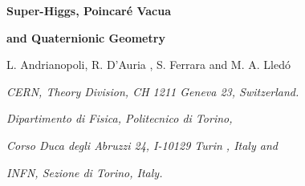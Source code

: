 \documentclass[a4paper,12pt]{article}
\begin{document}

\providecommand{\R}{\mathbb{R}}
\providecommand{\C}{\mathbb{C}}
\providecommand{\Z}{\mathbb{Z}}
\providecommand{\Hb}{\mathbb{H}}

\providecommand{\rE}{\mathrm{E}}
\providecommand{\ii}{\mathrm{i}}
\providecommand{\rSp}{\mathrm{Sp}}
\providecommand{\rSO}{\mathrm{SO}}
\providecommand{\rSL}{\mathrm{SL}}
\providecommand{\rSU}{\mathrm{SU}}
\providecommand{\rUSp}{\mathrm{USp}}
\providecommand{\rU}{\mathrm{U}}
\providecommand{\rF}{\mathrm{F}}
\providecommand{\rGL}{\mathrm{GL}}
\providecommand{\rG}{\mathrm{G}}
\providecommand{\rK}{\mathrm{K}}


\providecommand{\fgl}{\mathfrak{gl}}
\providecommand{\fu}{\mathfrak{u}}
\providecommand{\fsl}{\mathfrak{sl}}
\providecommand{\fsp}{\mathfrak{sp}}
\providecommand{\fusp}{\mathfrak{usp}}
\providecommand{\fsu}{\mathfrak{su}}
\providecommand{\fp}{\mathfrak{p}}
\providecommand{\fso}{\mathfrak{so}}
\providecommand{\fl}{\mathfrak{l}}
\providecommand{\fg}{\mathfrak{g}}
\providecommand{\fr}{\mathfrak{r}}
\providecommand{\fe}{\mathfrak{e}}
\providecommand{\ft}{\mathfrak{t}}
\providecommand{\id}{\relax{\rm 1\kern-.35em 1}}





\vskip 1cm


  \centerline{\LARGE \bf {}\coordHE{} Super-Higgs, \coordHE{} Poincar\'e  Vacua}

  \bigskip

   \centerline{\LARGE \bf and Quaternionic Geometry}





 \vskip 1.5cm
\centerline{L. Andrianopoli\myHighlight{$^\flat$}\coordHE{}, R. D'Auria\myHighlight{$^\sharp$}\coordHE{}
,  S.
Ferrara\myHighlight{$^{\flat \star}$}\coordHE{} and
 M. A. Lled\'o\myHighlight{$^\sharp$}\coordHE{} }
\vskip 1cm

\centerline{\it \myHighlight{$^\flat$}\coordHE{} CERN, Theory Division, CH 1211 Geneva 23,
Switzerland.}

\bigskip



\centerline{\it \myHighlight{$^\sharp$}\coordHE{} Dipartimento di Fisica, Politecnico di
Torino,} \centerline{\it Corso Duca degli Abruzzi 24, I-10129
Turin , Italy  and  } \centerline{\it   INFN, Sezione di Torino,
Italy. }
\end{document}
